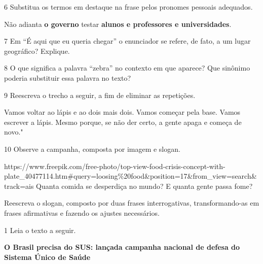 \num{6} Substitua os termos em destaque na frase pelos pronomes pessoais
adequados.

Não adianta \textbf{o governo} testar \textbf{alunos e professores e
universidades}.



\num{7} Em ``É aqui que eu queria chegar'' o enunciador se refere, de
fato, a um lugar geográfico? Explique.



\num{8} O que significa a palavra ``zebra'' no contexto em que aparece?
Que sinônimo poderia substituir essa palavra no texto?



\num{9} Reescreva o trecho a seguir, a fim de eliminar as repetições.

Vamos voltar ao lápis e ao dois mais dois. Vamos começar pela base.
Vamos escrever a lápis. Mesmo porque, se não der certo, a gente apaga e
começa de novo."



\num{10} Observe a campanha, composta por imagem e slogan.

https://www.freepik.com/free-photo/top-view-food-crisis-concept-with-plate\_40477114.htm\#query=loosing\%20food\&position=17\&from\_view=search\&track=ais
Quanta comida se desperdiça no mundo? E quanta gente passa fome?

Reescreva o slogan, composto por duas frases interrogativas,
transformando-as em frases afirmativas e fazendo os ajustes necessários.




\num{1} Leia o texto a seguir.

\textbf{O Brasil precisa do SUS: lançada campanha nacional de defesa do
Sistema Único de Saúde}

